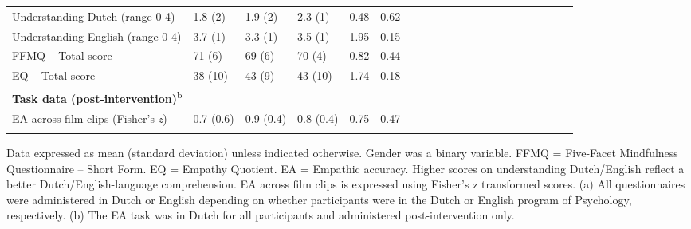 \documentclass[authordate, empirical, issue]{jote-new-article}
\begin{document}
\begin{table}[h!]
\begin{fullwidth}
\begin{tabularx}{\linewidth}{@{} l l l l l l l l l l l l l l l l l l l l l  @{}}
      Understanding Dutch (range 0-4)                           & 1.8 (2)                     & 1.9 (2)                         & 2.3 (1)           & 0.48 & 0.62
      \\

      Understanding English (range 0-4)                         & 3.7 (1)                     & 3.3 (1)                         & 3.5 (1)           & 1.95 & 0.15
      \\

      FFMQ – Total score                                        & 71 (6)                      & 69 (6)                          & 70 (4)            & 0.82 & 0.44 \\

      EQ – Total score                                          & 38 (10)                     & 43 (9)                          & 43 (10)           & 1.74 & 0.18 \\

      \textbf{Task data (post-intervention)}\textsuperscript{b} &                             &                                 &                   &
                                                                &                                                                                                 \\

      EA across film clips (Fisher’s \emph{z})                  & 0.7 (0.6)                   & 0.9 (0.4)                       & 0.8 (0.4)
                                                                & 0.75                        & 0.47                                                              \\

      \bottomrule
      \\
    \end{tabularx}
    Data expressed as mean (standard deviation) unless indicated otherwise. Gender was a binary variable. FFMQ = Five-Facet Mindfulness Questionnaire -- Short Form. EQ = Empathy Quotient. EA = Empathic accuracy. Higher scores on understanding Dutch/English reflect a better Dutch/English-language comprehension. EA across film clips is expressed using Fisher's z transformed scores. (a) All questionnaires were administered in Dutch or English depending on whether participants were in the Dutch or English program of Psychology, respectively. (b) The EA task was in Dutch for all participants and administered post-intervention only.
  \end{fullwidth}
\end{table}
\end{document}
